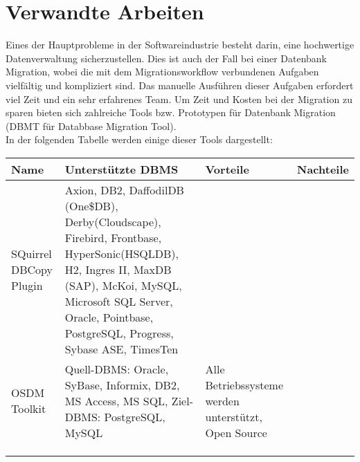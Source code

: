\section{Verwandte Arbeiten}
Eines der Hauptprobleme in der Softwareindustrie besteht darin, eine hochwertige Datenverwaltung sicherzustellen. Dies ist auch der Fall bei einer Datenbank Migration, wobei die mit dem Migrationsworkflow verbundenen Aufgaben vielfältig und kompliziert sind. Das manuelle Ausführen dieser Aufgaben erfordert viel Zeit und ein sehr erfahrenes Team. Um Zeit und Kosten bei der Migration zu sparen bieten sich zahlreiche Tools bzw. Prototypen für Datenbank Migration (DBMT für Databbase Migration Tool).\\
In der folgenden Tabelle werden einige dieser Tools dargestellt: 
\begin{center}
	\begin{tabular}{ |p{2cm}|p{3cm}|p{4cm}|p{4cm}| }
		\hline
		\textbf{Name}} & \textbf{Unterstützte DBMS} & \textbf{Vorteile} & \textbf{Nachteile} \\
		\hline
		 SQuirrel DBCopy Plugin & 
		 Axion,
		 DB2,
		 DaffodilDB (One\$DB),
		 Derby(Cloudscape),
		 Firebird,
		 Frontbase,
		 HyperSonic(HSQLDB),
		 H2,
		 Ingres II,
		 MaxDB (SAP),
		 McKoi,
		 MySQL,
		 Microsoft SQL Server,
		 Oracle,
		 Pointbase,
		 PostgreSQL,
		 Progress,
		 Sybase ASE,
		 TimesTen  & & \\
		 \hline
		 OSDM Toolkit & 
		 Quell-DBMS: Oracle, SyBase, Informix, DB2, MS Access, MS SQL, Ziel-DBMS: PostgreSQL, MySQL & 
		 Alle  Betriebssysteme werden unterstützt, Open Source &  \\
		 \hline
		 & & & \\
		 \hline
		 & & &  \\
		 \hline
		 & & &  \\
		\hline
	\end{tabular}
\end{center}


